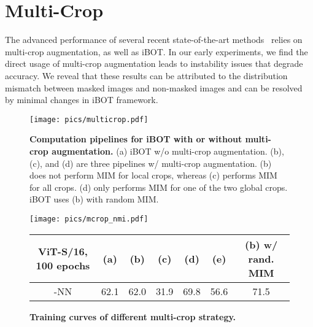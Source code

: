 \documentclass{article} \usepackage{iclr2022_conference,times}
\def\ourmethod{{iBOT}\xspace}
\begin{document}
\section{Multi-Crop}
\label{sec:multicrop}

The advanced performance of several recent state-of-the-art methods~\citep{dino,swav} relies on multi-crop augmentation, as well as \ourmethod. 
In our early experiments, we find the direct usage of multi-crop augmentation leads to instability issues that degrade accuracy. We reveal that these results can be attributed to the distribution mismatch between masked images and non-masked images and can be resolved by minimal changes in \ourmethod framework. 

\begin{figure}[!t]
\centering
\texttt{[image: pics/multicrop.pdf]}
\vspace{-0.2cm}
\caption{\textbf{Computation pipelines for \ourmethod with or without multi-crop augmentation.} (a) \ourmethod w/o multi-crop augmentation. (b), (c), and (d) are three pipelines w/ multi-crop augmentation. (b) does not perform MIM for local crops, whereas (c) performs MIM for all crops. (d) only performs MIM for one of the two global crops. \ourmethod uses (b) with random MIM.}
\vspace{-0.2cm}
\label{fig:multicrop}
\end{figure}

\begin{figure}[!t]
\centering
\texttt{[image: pics/mcrop\_nmi.pdf]}
\vspace{-0.3cm}
\begin{table}[H]
\centering
\begin{tabular}{cccccc>{\columncolor{cyan!50}}c}
ViT-S/16, 100 epochs & (a) & (b) & (c) & (d) & (e) & (b) w/ rand. MIM \\
\toprule
-NN & 62.1 & 62.0 & 31.9 & 69.8 & 56.6 & 71.5 \\
\end{tabular}
\end{table}
\vspace{-0.5cm}
\caption{\textbf{Training curves of different multi-crop strategy.} }
\label{fig:mcropnmi}
\end{figure}
\end{document}
